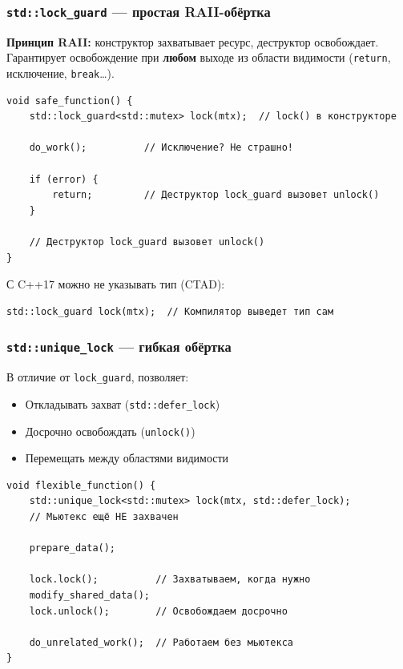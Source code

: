 \documentclass[a4paper,12pt]{article}
\begin{document}
\subsubsection{\texttt{std::lock\_guard} --- простая RAII-обёртка}

\textbf{Принцип RAII:} конструктор захватывает ресурс, деструктор освобождает.
Гарантирует освобождение при \textbf{любом} выходе из области видимости
(\texttt{return}, исключение, \texttt{break}\ldots).

\begin{lstlisting}
void safe_function() {
    std::lock_guard<std::mutex> lock(mtx);  // lock() в конструкторе

    do_work();          // Исключение? Не страшно!

    if (error) {
        return;         // Деструктор lock_guard вызовет unlock()
    }

    // Деструктор lock_guard вызовет unlock()
}
\end{lstlisting}

С C++17 можно не указывать тип (CTAD):

\begin{lstlisting}
std::lock_guard lock(mtx);  // Компилятор выведет тип сам
\end{lstlisting}

\subsubsection{\texttt{std::unique\_lock} --- гибкая обёртка}

В отличие от \texttt{lock\_guard}, позволяет:
\begin{itemize}
    \item Откладывать захват (\texttt{std::defer\_lock})
    \item Досрочно освобождать (\texttt{unlock()})
    \item Перемещать между областями видимости
\end{itemize}

\begin{lstlisting}
void flexible_function() {
    std::unique_lock<std::mutex> lock(mtx, std::defer_lock);
    // Мьютекс ещё НЕ захвачен

    prepare_data();

    lock.lock();          // Захватываем, когда нужно
    modify_shared_data();
    lock.unlock();        // Освобождаем досрочно

    do_unrelated_work();  // Работаем без мьютекса
}
\end{lstlisting}
\end{document}
